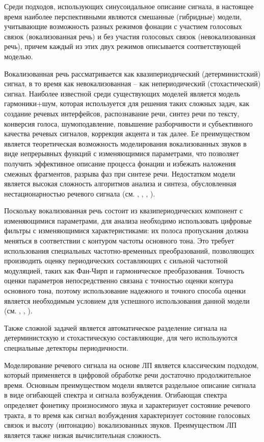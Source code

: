 Среди подходов, использующих синусоидальное описание сигнала, в настоящее время наиболее перспективными являются смешанные (гибридные) модели, учитывающие возможность разных режимов фонации с участием голосовых связок (вокализованная речь) и без участия голосовых связок (невокализованная речь), причем каждый из этих двух режимов описывается соответствующей моделью. 

Вокализованная речь рассматривается как квазипериодический (детерминистский) сигнал, в то время как невокализованная – как непериодический (стохастический) сигнал. Наиболее известной среди существующих моделей является модель гармоники+шум, которая используется для решения таких сложных задач, как создание речевых интерфейсов, распознавание речи, синтез речи по тексту, конверсия голоса, шумоподавление, повышение разборчивости и субъективного качества речевых сигналов, коррекция акцента и так далее. Ее преимуществом является теоретическая возможность моделирования вокализованных звуков в виде непрерывных функций с изменяющимися параметрами, что позволяет получить эффективное описание процесса фонации и избежать наложения смежных фрагментов, разрыва фаз при синтезе речи. Недостатком модели является высокая сложность алгоритмов анализа и синтеза, обусловленная нестационарностью речевого сигнала (см. , , , ). 

Поскольку вокализованная речь состоит из квазипериодических компонент с изменяющимися параметрами, для анализа необходимо использовать цифровые фильтры с изменяющимися характеристиками: их полоса пропускания должна меняться в соответствии с контуром частоты основного тона. Это требует использования специальных частотно-временных преобразований, позволяющих производить оценку периодических составляющих с сильной частотной модуляцией, таких как Фан-Чирп и гармоническое преобразования. Точность оценки параметров непосредственно связана с точностью оценки контура основного тона, поэтому использование надежного и точного способа оценки является необходимым условием для успешного использования данной модели (см. , , ). 

Также сложной задачей является автоматическое разделение сигнала на детерминистскую и стохастическую составляющие, для чего используются специальные детекторы периодичности.

Моделирование речевого сигнала на основе ЛП является классическим подходом, который применяется в цифровой обработке речи достаточно продолжительное время. Основным преимуществом модели является раздельное описание сигнала в виде огибающей спектра и сигнала возбуждения. Огибающая спектра определяет фонетику произносимого звука и характеризует состояние речевого тракта, в то время как сигнал возбуждения характеризует состояние голосовых связок и высоту (интонацию) вокализованных звуков. Преимуществом ЛП является также низкая вычислительная сложность. 

